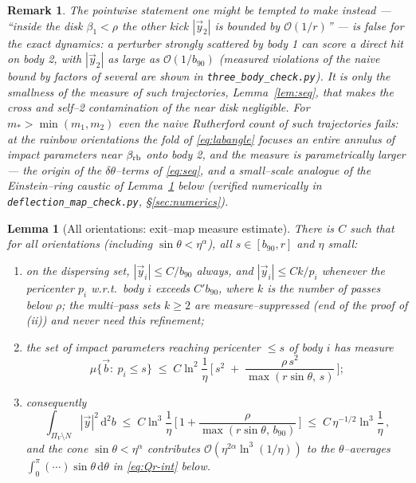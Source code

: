 \documentclass[11pt]{article}
\newcommand{\dd}{\mathrm{d}}
\newcommand{\bv}{\vec b}
\newcommand{\order}[1]{\mathcal O\!\left(#1\right)}
\newtheorem{lemma}{Lemma}
\newtheorem{remark}{Remark}
\begin{document}
\begin{remark}
The pointwise statement one might be tempted to make instead --- ``inside the disk
$\beta_1<\rho$ the other kick $|\vec y_2|$ is bounded by $\order{1/r}$'' --- is \emph{false} for the
exact dynamics: a perturber strongly scattered by body 1 can score a direct hit on body 2, with
$|\vec y_2|$ as large as $\order{1/b_{90}}$ (measured violations of the naive bound by factors of
several are shown in \texttt{three\_body\_check.py}). It is only the smallness of the measure of
such trajectories, Lemma~\ref{lem:seq}, that makes the cross and self--2 contamination of the near
disk negligible. For $m_*>\min(m_1,m_2)$ even the naive Rutherford \emph{count} of such
trajectories fails: at the rainbow orientations the fold of \eqref{eq:labangle} focuses an entire
annulus of impact parameters near $\beta_{\rm rb}$ onto body 2, and the measure is parametrically
larger --- the origin of the $\delta\theta$--terms of \eqref{eq:seq}, and a small--scale analogue
of the Einstein--ring caustic of Lemma~\ref{lem:cone} below (verified numerically in
\texttt{deflection\_map\_check.py}, \S\ref{sec:numerics}).
\end{remark}

\begin{lemma}[All orientations: exit--map measure estimate]
\label{lem:cone}
There is $C$ such that for all orientations (including $\sin\theta<\eta^\alpha$), all
$s\in[b_{90},r]$ and $\eta$ small:
\begin{enumerate}
\item[(i)] on the dispersing set, $|\vec y_i|\le C/b_{90}$ always, and
$|\vec y_i|\le Ck/p_i$ whenever the pericenter $p_i$ w.r.t.\ body $i$ exceeds $C'b_{90}$, where
$k$ is the number of passes below $\rho$; the multi--pass sets $k\ge2$ are measure--suppressed
(end of the proof of (ii)) and never need this refinement;
\item[(ii)] the set of impact parameters reaching pericenter $\le s$ of body $i$ has measure
\begin{equation}
  \mu\big\{\bv:\ p_i\le s\big\}\;\le\;C\ln^2\!\frac1\eta\,
  \Big[\,s^2\;+\;\frac{\rho\,s^2}{\max(r\sin\theta,\,s)}\,\Big];
  \label{eq:cone-measure}
\end{equation}
\item[(iii)] consequently
\begin{equation}
  \int_{\Pi_V\setminus N}|\vec y|^2\,\dd^2b\;\le\;
  C\ln^3\!\frac1\eta\,\Big[\,1+\frac{\rho}{\max(r\sin\theta,\,b_{90})}\,\Big]
  \;\le\;C\,\eta^{-1/2}\ln^3\!\frac1\eta\,,
  \label{eq:cone}
\end{equation}
and the cone $\sin\theta<\eta^\alpha$ contributes $\order{\eta^{2\alpha}\ln^3(1/\eta)}$ to
the $\theta$--averages $\int_0^\pi(\cdots)\sin\theta\,\dd\theta$ in \eqref{eq:Qr-int} below.
\end{enumerate}
\end{lemma}
\end{document}
